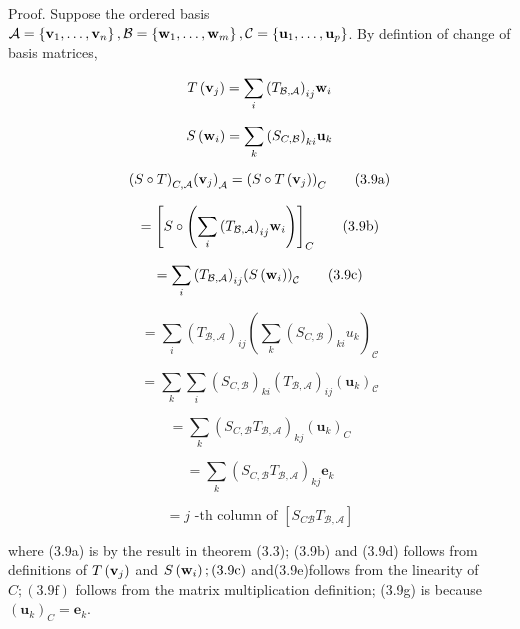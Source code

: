 \documentclass[11pt]{article}
\begin{document}
Proof. Suppose the ordered basis \(\mathcal{A} = \left\{  {{\bf v}_1,\ldots ,{\bf v}_n}\right\}  ,\mathcal{B} = \left\{  {{\bf w}_1,\ldots ,{\bf w}_{m}}\right\}  ,\mathcal{C} = \left\{  {{\mathbf{u}}_1,\ldots ,{\mathbf{u}}_{p}}\right\}\). By defintion of change of basis matrices,

\[
T\left( {\bf v}_{j}\right)  = \mathop{\sum }\limits_{i}{\left( {T}_{\mathcal{B},\mathcal{A}}\right) }_{ij}{\bf w}_{i}
\]

\[
S\left( {\bf w}_{i}\right)  = \mathop{\sum }\limits_{k}{\left( {S}_{C,\mathcal{B}}\right) }_{ki}{\mathbf{u}}_{k}
\]

\[
{\left( S \circ  T\right) }_{C,\mathcal{A}}{\left( {\bf v}_{j}\right) }_{\mathcal{A}} = {\left( S \circ  T\left( {\bf v}_{j}\right) \right) }_{C} \tag{3.9a}
\]

\[
= {\left\lbrack  S \circ  \left( \mathop{\sum }\limits_{i}{\left( {T}_{\mathcal{B},\mathcal{A}}\right) }_{ij}{\bf w}_{i}\right) \right\rbrack  }_{C} \tag{3.9b}
\]

\[
= \mathop{\sum }\limits_{i}{\left( {T}_{\mathcal{B},\mathcal{A}}\right) }_{ij}{\left( S\left( {\bf w}_{i}\right) \right) }_{\mathcal{C}} \tag{3.9c}
\]

\[
= \mathop{\sum }\limits_{i}{\left( {T}_{\mathcal{B},\mathcal{A}}\right) }_{ij}{\left( \mathop{\sum }\limits_{k}{\left( {S}_{C,\mathcal{B}}\right) }_{ki}{u}_{k}\right) }_{\mathcal{C}} \tag{3.9d}
\]

\[
= \mathop{\sum }\limits_{k}\mathop{\sum }\limits_{i}{\left( {S}_{C,\mathcal{B}}\right) }_{ki}{\left( {T}_{\mathcal{B},\mathcal{A}}\right) }_{ij}{\left( {\mathbf{u}}_{k}\right) }_{\mathcal{C}} \tag{3.9e}
\]

\[
= \mathop{\sum }\limits_{k}{\left( {S}_{C,\mathcal{B}}{T}_{\mathcal{B},\mathcal{A}}\right) }_{kj}{\left( {\mathbf{u}}_{k}\right) }_{C} \tag{3.9f}
\]

\[
= \mathop{\sum }\limits_{k}{\left( {S}_{C,\mathcal{B}}{T}_{\mathcal{B},\mathcal{A}}\right) }_{kj}{\mathbf{e}}_{k} \tag{3.9g}
\]

\[
= j\text{ -th column of }\left\lbrack  {{S}_{C\mathcal{B}}{T}_{\mathcal{B},\mathcal{A}}}\right\rbrack   \tag{3.9h}
\]

where (3.9a) is by the result in theorem (3.3); (3.9b) and (3.9d) follows from definitions of \(T\left( {\bf v}_{j}\right)\) and \(S\left( {\bf w}_{i}\right) ;\left( {{3.9}\mathrm{c}}\right)\) and(3.9e)follows from the linearity of \(C;\left( {{3.9}\mathrm{f}}\right)\) follows from the matrix multiplication definition; (3.9g) is because \({\left( {\mathbf{u}}_{k}\right) }_{C} = {\mathbf{e}}_{k}\).
\end{document}
